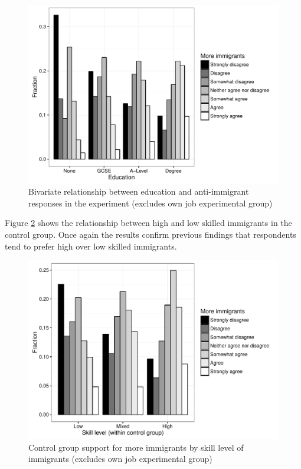 \documentclass{article}\usepackage[]{graphicx}\usepackage[]{color}
\makeatletter
\def\maxwidth{ %
  \ifdim\Gin@nat@width>\linewidth
    \linewidth
  \else
    \Gin@nat@width
  \fi
}
\makeatother
\begin{document}
\begin{appendix}
\begin{figure}
\includegraphics[width=\maxwidth]{figure/hhFig1-1} \caption[Bivariate relationship between education and anti-immigrant responses in the experiment (excludes own job experimental group)]{Bivariate relationship between education and anti-immigrant responses in the experiment (excludes own job experimental group)}\label{fig:hhFig1}
\end{figure}



Figure \ref{fig:hhFig2} shows the relationship between high and low skilled immigrants in the control group. Once again the results confirm previous findings that respondents tend to prefer high over low skilled immigrants. 

\begin{figure}
\includegraphics[width=\maxwidth]{figure/hhFig2-1} \caption[Control group support for more immigrants by skill level of immigrants  (excludes own job experimental group)]{Control group support for more immigrants by skill level of immigrants  (excludes own job experimental group)}\label{fig:hhFig2}
\end{figure}


\end{appendix}
\end{document}

